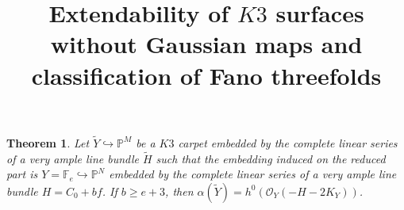\documentclass[11pt,twoside]{amsart}
\theoremstyle{plain}
\numberwithin{equation}{section}
\newtheorem{theorem}{Theorem}[section]
\theoremstyle{definition}
\begin{document}
\title[Extendability of $K3$ surfaces without Gaussian maps and classification of Fano threefolds]{Extendability of $K3$ surfaces without Gaussian maps and classification of Fano threefolds}






\begin{theorem}\label{ZL for K3 carpets}
 Let $\widetilde{Y} \hookrightarrow \mathbb{P}^M$ be a $K3$ carpet embedded by the complete linear series of a very ample line bundle $\widetilde{H}$ such that the embedding induced on the reduced part is $Y = \mathbb{F}_e \hookrightarrow \mathbb{P}^N$ embedded by the complete linear series of a very ample line bundle $H = C_0+bf$. If $b \geq e+3$, then $\alpha(\widetilde Y) = h^0(\mathcal{O}_Y(-H-2K_Y))$.
 \end{theorem}
\end{document}
